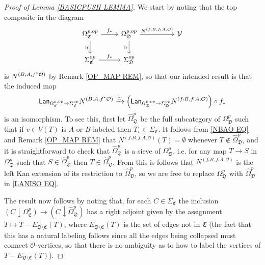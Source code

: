 \documentclass[a4paper,10pt
,draft
]{article}%
\numberwithin{equation}{section}
\numberwithin{figure}{section}
\theoremstyle{definition} %
\newcommand{\1}{\ensuremath{\mathbbm 1}}%
\begin{document}
\begin{proof}[Proof of Lemma \ref{BASICPUSH LEMMA}]

We start by noting that the top composite in the diagram
\[
\begin{tikzcd}
	\Omega_{\mathfrak{C}}^{p,op} \ar{r}{f_{\**}} \ar{d}[swap]{\mathsf{lr}} &
	\Omega_{\mathfrak{D}}^{p,op} \ar{rr}{N^{(f_!B,f_!A,\mathcal{O})}} \ar{d}[swap]{\mathsf{lr}} &&
	\mathcal{V}
\\
	\Sigma_{\mathfrak{C}}^{op} \ar{r}{f_{\**}} &
	\Sigma_{\mathfrak{D}}^{op} %
\end{tikzcd}
\]
is $N^{(B,A,f^{\**}\mathcal{O})}$ by Remark \ref{OP_MAP REM}, so that our intended result is that the induced map
\begin{equation}\label{LANISO EQ}
	\mathsf{Lan}_{\Omega_{\mathfrak{C}}^{p,op} \to \Sigma_{\mathfrak{C}}^{op}}
	N^{(B,A,f^{\**}\mathcal{O})}
\xrightarrow{\simeq}
\left(
	\mathsf{Lan}_{\Omega_{\mathfrak{D}}^{p,op} \to \Sigma_{\mathfrak{D}}^{op}}
	N^{(f_!B,f_!A,\mathcal{O})}
\right) \circ f_{\**}
\end{equation}
is an isomorphism. To see this, first let $\widehat{\Omega}^p_{\mathfrak{D}}$
be the full subcategory of $\Omega^p_{\mathfrak{D}}$
such that if 
$v \in V(T)$ is $A$ or $B$-labeled then $T_v \in \Sigma_{\mathfrak C}$.
It follows from \eqref{NBAO EQ} and Remark \ref{OP_MAP REM} that $N^{(f_! B, f_! A, \mathcal{O})}(T) = \emptyset$ whenever $T \not \in \widehat{\Omega}^p_{\mathfrak{D}}$,
and it is straightforward to check that 
$\widehat{\Omega}^p_{\mathfrak{D}}$
is a sieve of $\Omega^p_{\mathfrak{D}}$, i.e. for any map $T \to S$ in $\Omega^p_{\mathfrak{D}}$ such that $S \in \widehat{\Omega}^p_{\mathfrak{D}}$ then $T \in \widehat{\Omega}^p_{\mathfrak{D}}$.
From this is follows that 
$N^{(f_!B,f_!A,\mathcal{O})}$
is the left Kan extension of its restriction to 
$\widehat{\Omega}^p_{\mathfrak{D}}$, 
so we are free to replace
$\Omega^p_{\mathfrak{D}}$
with
$\widehat{\Omega}^p_{\mathfrak{D}}$
in \eqref{LANISO EQ}.

The result now follows by noting that,
for each $C \in \Sigma_{\mathfrak{C}}$
the inclusion
$(C \downarrow \Omega^p_{\mathfrak{C}})
\to
(C \downarrow \widehat{\Omega}^p_{\mathfrak{D}})
$
has a right adjoint given by the assignment $T \mapsto T - E_{\mathfrak{D} \setminus \mathfrak{C}}(T)$,
where 
$E_{\mathfrak{D} \setminus \mathfrak{C}}(T)$ is the set of edges not in $\mathfrak{C}$ (the fact that this has a natural labeling follows since all the edges being collapsed must connect $\mathcal{O}$-vertices, so that there is no ambiguity as to how to label the vertices of $T - E_{\mathfrak{D} \setminus \mathfrak{C}}(T)$).
\end{proof}
\end{document}
